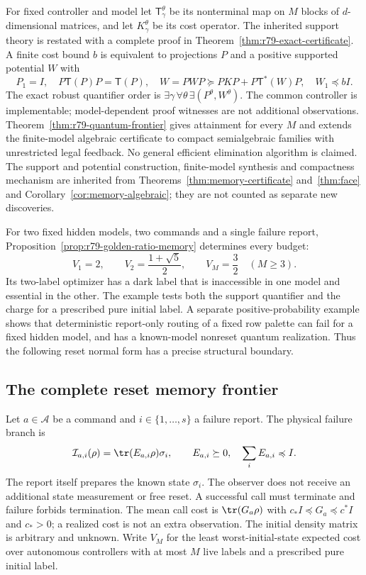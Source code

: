 For fixed controller and model let $\mathsf T^\theta_\gamma$ be its
nonterminal map on $M$ blocks of $d$-dimensional matrices, and let
$K^\theta_\gamma$ be its cost operator.  The inherited support theory
is restated with a complete proof in
Theorem~\ref{thm:r79-exact-certificate}.  A finite cost bound $b$ is
equivalent to projections $P$ and a positive supported potential $W$
with
\[
 P_1=I,\quad P\mathsf T(P)P=\mathsf T(P),\quad
 W=PWP\succeq PKP+P\mathsf T^*(W)P,\quad W_1\preccurlyeq bI.
\]
The exact robust quantifier order is
$\exists\gamma\,\forall\theta\,\exists(P^\theta,W^\theta)$.
The common controller is implementable; model-dependent proof witnesses
are not additional observations.  Theorem~\ref{thm:r79-quantum-frontier}
gives attainment for every $M$ and extends the finite-model algebraic
certificate to compact semialgebraic families with unrestricted legal
feedback.  No general efficient elimination algorithm is claimed.
The support and potential construction, finite-model synthesis and
compactness mechanism are inherited from
Theorems~\ref{thm:memory-certificate} and~\ref{thm:face} and
Corollary~\ref{cor:memory-algebraic}; they are not counted as separate
new discoveries.

For two fixed hidden models, two commands and a single failure report,
Proposition~\ref{prop:r79-golden-ratio-memory} determines every budget:
\begin{equation}\label{eq:r79-intro-golden}
 V_1=2,\qquad V_2=\frac{1+\sqrt5}{2},\qquad
 V_M=\frac32\quad(M\ge3).
\end{equation}
Its two-label optimizer has a dark label that is inaccessible in one
model and essential in the other.  The example tests both the support
quantifier and the charge for a prescribed pure initial label.  A
separate positive-probability example shows that deterministic
report-only routing of a fixed row palette can fail for a fixed hidden
model, and has a known-model nonreset quantum realization.  Thus the
following reset normal form has a precise structural boundary.

\subsection*{The complete reset memory frontier}

Let $a\in\mathcal A$ be a command and $i\in\{1,\ldots,s\}$ a failure
report.  The physical failure branch is
\[
 \mathcal I_{a,i}(\rho)=\tr(E_{a,i}\rho)\sigma_i,
 \qquad E_{a,i}\succeq0,\quad \sum_iE_{a,i}\preccurlyeq I.
\]
The report itself prepares the known state $\sigma_i$.  The observer
does not receive an additional state measurement or free reset.  A
successful call must terminate and failure forbids termination.  The
mean call cost is $\tr(G_a\rho)$ with
$c_*I\preccurlyeq G_a\preccurlyeq c^*I$ and $c_*>0$; a realized cost is
not an extra observation.  The initial density matrix is arbitrary and
unknown.  Write $V_M$ for the least worst-initial-state expected cost
over autonomous controllers with at most $M$ live labels and a prescribed
pure initial label.

